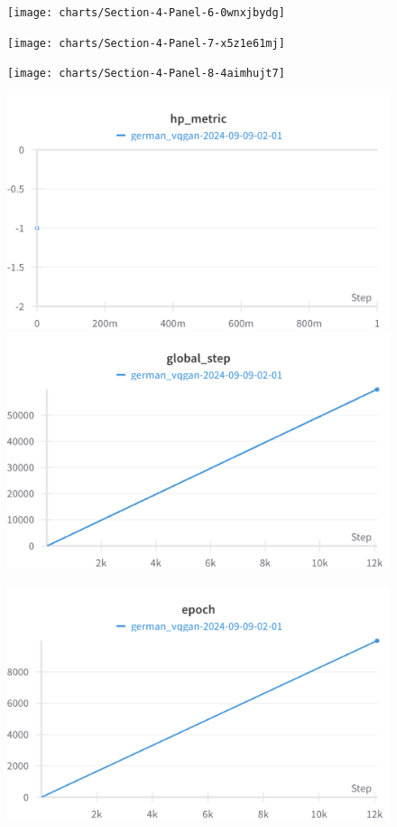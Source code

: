 \documentclass{article}
\begin{document}
\begin{figure}[!htb]
\texttt{[image: charts/Section-4-Panel-6-0wnxjbydg]}
\caption{}
\endminipage\hfill
{}
\texttt{[image: charts/Section-4-Panel-7-x5z1e61mj]}
\caption{}
\endminipage
\end{figure}

\begin{figure}[!htb]
\texttt{[image: charts/Section-4-Panel-8-4aimhujt7]}
\caption{}
\endminipage
\end{figure}

\begin{figure}[!htb]
\includegraphics[width=\linewidth]{charts/Section-8-Panel-0-dn8bpp6rt}
\caption{}
\endminipage\hfill
{}
\includegraphics[width=\linewidth]{charts/Section-8-Panel-1-z2xepgyu7}
\caption{}
\endminipage
\end{figure}

\begin{figure}[!htb]
\includegraphics[width=\linewidth]{charts/Section-8-Panel-2-4t8ldmpb8}
\caption{}
\endminipage
\end{figure}

\nocite{*}


\end{document}
